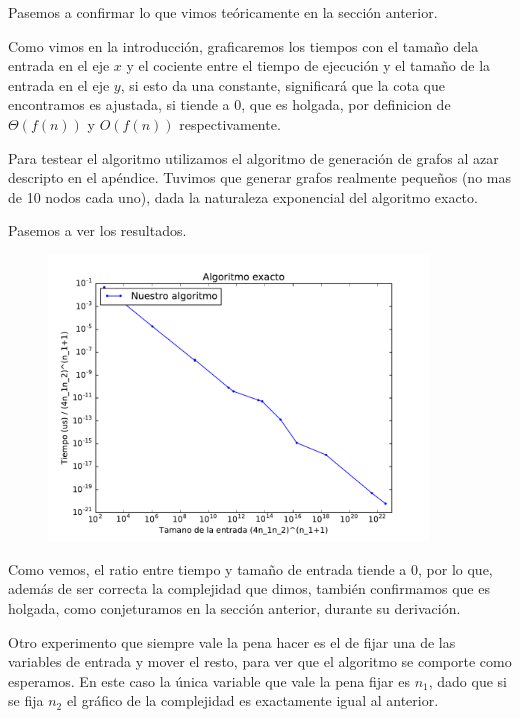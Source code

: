 Pasemos a confirmar lo que vimos teóricamente en la sección anterior.

Como vimos en la introducción, graficaremos los tiempos con el tamaño dela entrada en el eje $x$ y el cociente entre el tiempo de ejecución y el tamaño de la entrada en el eje $y$, si esto da una constante, significará que la cota que encontramos es ajustada, si tiende a 0, que es holgada, por definicion de $\Theta(f(n))$ y $O(f(n))$ respectivamente.

Para testear el algoritmo utilizamos el algoritmo de generación de grafos al azar descripto en el ap\'endice. Tuvimos que generar grafos realmente pequeños (no mas de 10 nodos cada uno), dada la naturaleza exponencial del algoritmo exacto.

Pasemos a ver los resultados.

\begin{figure}[H]
 \centering
	\includegraphics[width=0.9\textwidth]{graficos/problema_2/tiempos_1.pdf}
	\caption{}
	\label{fig:problema2-1}
\end{figure}

Como vemos, el ratio entre tiempo y tamaño de entrada tiende a 0, por lo que, además de ser correcta la complejidad que dimos, tambi\'en confirmamos que es holgada, como conjeturamos en la sección anterior, durante su derivación.

Otro experimento que siempre vale la pena hacer es el de fijar una de las variables de entrada y mover el resto, para ver que el algoritmo se comporte como esperamos. En este caso la única variable que vale la pena fijar es $n_1$, dado que si se fija $n_2$ el gráfico de la complejidad es exactamente igual al anterior.

